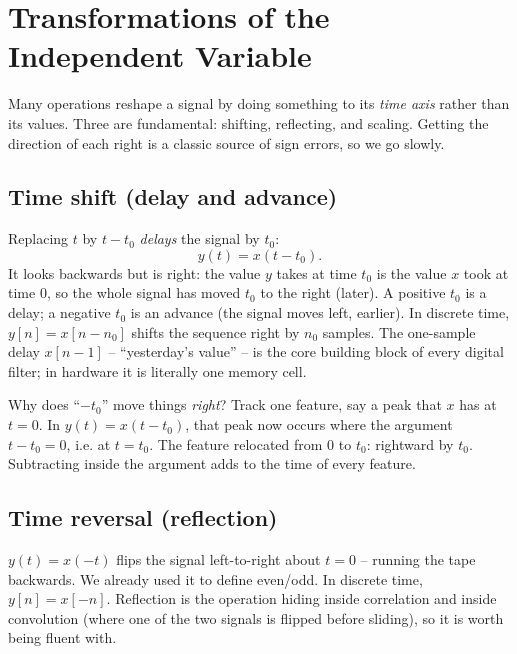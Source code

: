 \section{Transformations of the Independent Variable}
\label{ch02:transforms}

Many operations reshape a signal by doing something to its \emph{time axis} rather
than its values. Three are fundamental: shifting, reflecting, and scaling. Getting
the direction of each right is a classic source of sign errors, so we go slowly.

\subsection{Time shift (delay and advance)}

Replacing $t$ by $t - t_0$ \emph{delays} the signal by $t_0$:
\[
  y(t) = x(t - t_0).
\]
It looks backwards but is right: the value $y$ takes at time $t_0$ is the value $x$
took at time $0$, so the whole signal has moved $t_0$ to the right (later). A
positive $t_0$ is a delay; a negative $t_0$ is an advance (the signal moves left,
earlier). In discrete time, $y[n] = x[n - n_0]$ shifts the sequence right by $n_0$
samples. The one-sample delay $x[n-1]$ -- ``yesterday's value'' -- is the core
building block of every digital filter; in hardware it is literally one memory cell.

\begin{intuitionbox}
Why does ``$-t_0$'' move things \emph{right}? Track one feature, say a peak that
$x$ has at $t=0$. In $y(t)=x(t-t_0)$, that peak now occurs where the argument
$t - t_0 = 0$, i.e. at $t = t_0$. The feature relocated from $0$ to $t_0$: rightward
by $t_0$. Subtracting inside the argument adds to the time of every feature.
\end{intuitionbox}

\subsection{Time reversal (reflection)}

$y(t) = x(-t)$ flips the signal left-to-right about $t=0$ -- running the tape
backwards. We already used it to define even/odd. In discrete time, $y[n]=x[-n]$.
Reflection is the operation hiding inside correlation and inside convolution (where
one of the two signals is flipped before sliding), so it is worth being fluent with.


